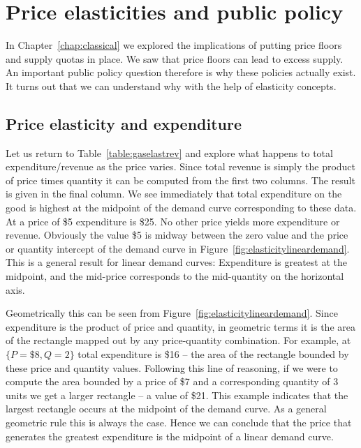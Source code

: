 \section{Price elasticities and public policy}\label{sec:ch4sec2}

In Chapter~\ref{chap:classical} we explored the implications of putting price floors and supply
quotas in place. We saw that price floors can lead to excess supply. An
important public policy question therefore is why these policies actually
exist. It turns out that we can understand why with the help of elasticity
concepts.

\subsection*{Price elasticity and expenditure}

Let us return to Table~\ref{table:gaselastrev} and explore what happens to total
expenditure/revenue as the price varies. Since total revenue is simply the
product of price times quantity it can be computed from the first two
columns. The result is given in the final column. We see immediately that
total expenditure on the good is highest at the midpoint of the demand
curve corresponding to these data. At a price of \$5 expenditure is \$25.
No other price yields more expenditure or revenue. Obviously the value 
\$5 is midway between the zero value and the price or quantity intercept of the
demand curve in Figure~\ref{fig:elasticitylineardemand}. This is a general result for linear demand
curves: Expenditure is greatest at the midpoint, and the mid-price
corresponds to the mid-quantity on the horizontal axis.

Geometrically this can be seen from Figure~\ref{fig:elasticitylineardemand}. Since expenditure is the
product of price and quantity, in geometric terms it is the area of the
rectangle mapped out by any price-quantity combination. For example, at $\{%
P=\$8,Q=2\}$ total expenditure is \$16 -- the area of the
rectangle bounded by these price and quantity values. Following this line of
reasoning, if we were to compute the area bounded by a price of \$7 and a
corresponding quantity of 3 units we get a larger rectangle -- a value of 
\$21. This example indicates that the largest rectangle occurs at the
midpoint of the demand curve. As a general geometric rule this is always
the case. Hence we can conclude that the price that generates the greatest
expenditure is the midpoint of a linear demand curve.

